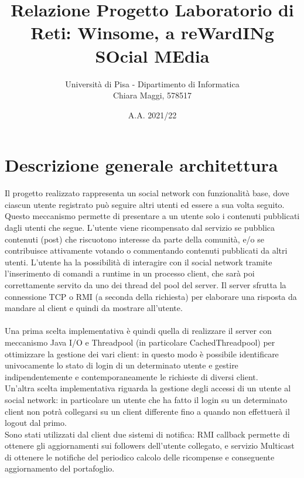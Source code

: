 \documentclass[11pt, a4paper, oneside]{article}
\begin{document}
\title{Relazione Progetto Laboratorio di Reti: Winsome, a reWardINg SOcial MEdia}
\author{Università di Pisa - Dipartimento di Informatica \\ Chiara Maggi, 578517}
\date{A.A. 2021/22}
\maketitle
\tableofcontents

\section{Descrizione generale architettura}
Il progetto realizzato rappresenta un social network con funzionalità base, dove ciascun utente registrato può seguire altri utenti ed essere a sua volta seguito. 
Questo meccanismo permette di presentare a un utente solo i contenuti pubblicati dagli utenti che segue. L’utente viene ricompensato dal servizio se pubblica contenuti
(post) che riscuotono interesse da parte della comunità, e/o se contribuisce attivamente votando o commentando contenuti pubblicati da altri utenti.
L'utente ha la possibilità di interagire con il social network tramite l’inserimento di comandi a runtime in un processo client, che sarà poi correttamente servito da 
uno dei thread del pool del server. Il server sfrutta la connessione TCP o RMI (a seconda della richiesta) per elaborare una risposta da mandare al client e quindi da 
mostrare all'utente.\\ \\
Una prima scelta implementativa è quindi quella di realizzare il server con meccanismo Java I/O e Threadpool (in particolare CachedThreadpool) per ottimizzare la 
gestione dei vari client: in questo modo è possibile identificare univocamente lo stato di login di un determinato utente e gestire indipendentemente e 
contemporaneamente le richieste di diversi client.\\ 
Un'altra scelta implementativa riguarda la gestione degli accessi di un utente al social network: in particolare un utente che ha fatto il login su un determinato 
client non potrà collegarsi su un client differente fino a quando non effettuerà il logout dal primo.\\
Sono stati utilizzati dal client due sistemi di notifica: RMI callback permette di ottenere gli aggiornamenti sui followers dell'utente collegato, e servizio 
Multicast di ottenere le notifiche del periodico calcolo delle ricompense e conseguente aggiornamento del portafoglio. 
\end{document}
